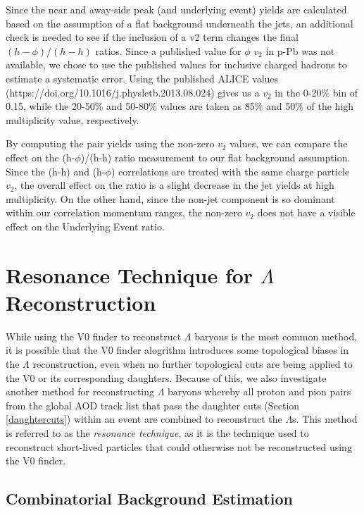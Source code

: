 \documentclass[ALICE,manyauthors]{ALICE_analysis_notes}
\begin{document}
Since the near and away-side peak (and underlying event) yields are calculated based on the assumption of a flat background underneath the jets, an additional check is needed to see if the inclusion of a v2 term changes the final $(h-\phi)/(h-h)$ ratios.  Since a published value for $\phi$ $v_2$ in p-Pb was not available, we chose to use the published values for inclusive charged hadrons to estimate a systematic error.  Using the published ALICE values (https://doi.org/10.1016/j.physletb.2013.08.024) gives us a $v_2$ in the 0-20\% bin of 0.15, while the 20-50\% and 50-80\% values are taken as 85\% and 50\% of the high multiplicity value, respectively.

By computing the pair yields using the non-zero $v_2$ values, we can compare the effect on the (h-$\phi$)/(h-h) ratio measurement to our flat background assumption.  Since the (h-h) and (h-$\phi$) correlations are treated with the same charge particle $v_2$, the overall effect on the ratio is a slight decrease in the jet yields at high multiplicity.  On the other hand, since the non-jet component is so dominant within our correlation momentum ranges, the non-zero $v_2$ does not have a visible effect on the Underlying Event ratio.


\clearpage
\appendix

\section{Resonance Technique for $\Lambda$ Reconstruction}
\label{resonance_technique}

While using the V0 finder to reconstruct $\Lambda$ baryons is the most common method, it is possible that the V0 finder alogrithm introduces some topological biases in the $\Lambda$ reconstruction, even when no further topological cuts are being applied to the V0 or its corresponding daughters. Because of this, we also investigate another method for reconstructing $\Lambda$ baryons whereby all proton and pion pairs from the global AOD track list that pass the daughter cuts (Section \ref{daughtercuts}) within an event are combined to reconstruct the $\Lambda$s. This method is referred to as the \textit{resonance technique}, as it is the technique used to reconstruct short-lived particles that could otherwise not be reconstructed using the V0 finder.

\subsection{Combinatorial Background Estimation}
\label{combinatorial_background}
\end{document}
